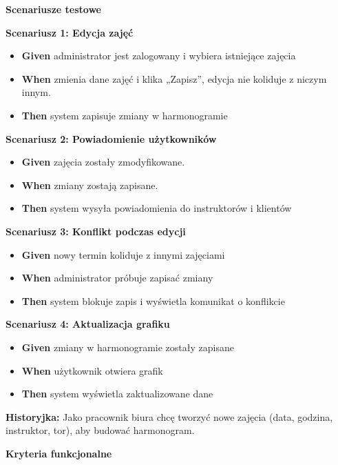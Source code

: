 \documentclass[a4paper,12pt]{article}
\begin{document}
\noindent \textbf{Scenariusze testowe}

\textbf{Scenariusz 1: Edycja zajęć}
\begin{itemize}
    \item \textbf{Given} administrator jest zalogowany i wybiera istniejące zajęcia
    \item \textbf{When} zmienia dane zajęć i klika „Zapisz”, edycja nie koliduje z niczym innym.
    \item \textbf{Then} system zapisuje zmiany w harmonogramie
\end{itemize}

\textbf{Scenariusz 2: Powiadomienie użytkowników}
\begin{itemize}
    \item \textbf{Given} zajęcia zostały zmodyfikowane.
    \item \textbf{When} zmiany zostają zapisane.
    \item \textbf{Then} system wysyła powiadomienia do instruktorów i klientów
\end{itemize}

\textbf{Scenariusz 3: Konflikt podczas edycji}
\begin{itemize}
    \item \textbf{Given} nowy termin koliduje z innymi zajęciami
    \item \textbf{When} administrator próbuje zapisać zmiany
    \item \textbf{Then} system blokuje zapis i wyświetla komunikat o konflikcie
\end{itemize}

\textbf{Scenariusz 4: Aktualizacja grafiku}
\begin{itemize}
    \item \textbf{Given} zmiany w harmonogramie zostały zapisane
    \item \textbf{When} użytkownik otwiera grafik
    \item \textbf{Then} system wyświetla zaktualizowane dane
\end{itemize}

\vspace{0,5cm}

\noindent \textbf{Historyjka:} Jako pracownik biura chcę tworzyć nowe zajęcia (data, godzina, instruktor, tor), aby budować harmonogram.

\vspace{0,2cm}

\noindent \textbf{Kryteria funkcjonalne}
\end{document}
